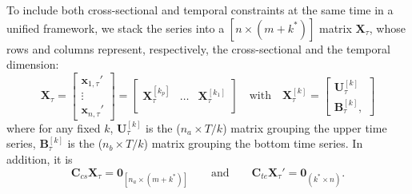 \documentclass[a4paper,11pt]{article}
\newcommand{\xvet}{\bm{x}}
\newcommand{\Bvet}{\bm{B}}
\newcommand{\Cvet}{\bm{C}}
\newcommand{\Uvet}{\bm{U}}
\newcommand{\Xvet}{\bm{X}}
\newcommand{\Zerovet}{\bm{0}}
\theoremstyle{definition}
\begin{document}
To include both cross-sectional and temporal constraints at the same time in a unified framework, we stack the series into a $[n \times (m+k^\ast)]$ matrix $\Xvet_\tau$, whose rows and columns represent, respectively, the cross-sectional and the temporal dimension:
\begin{equation}
	\label{eq:Xtau}
	\Xvet_\tau = \begin{bmatrix}
		\xvet_{1,\tau}' \\
		\vdots          \\
		\xvet_{n,\tau}'
	\end{bmatrix} = \begin{bmatrix}
		\Xvet_{\tau}^{[k_p]} & \dots & \Xvet_{\tau}^{[k_1]} \\ \end{bmatrix}
	\quad \text{with} \quad \Xvet_{\tau}^{[k]} = \begin{bmatrix}
		\Uvet_{\tau}^{[k]} \\
		\Bvet_{\tau}^{[k]},
	\end{bmatrix}
\end{equation}
where for any fixed $k$,
$\Uvet_{\tau}^{[k]}$ is the ($n_a\times T/k$) matrix grouping the upper time series, $\Bvet_{\tau}^{[k]}$ is the ($n_b\times T/k$) matrix grouping the bottom time series. In addition, it is
$$
	\Cvet_{cs}\Xvet_\tau = \Zerovet_{\left[n_a \times (m+k^\ast)\right]} \qquad \text{and} \qquad \Cvet_{te}\Xvet_\tau' = \Zerovet_{(k^\ast \times n)} .
$$


\end{document}
